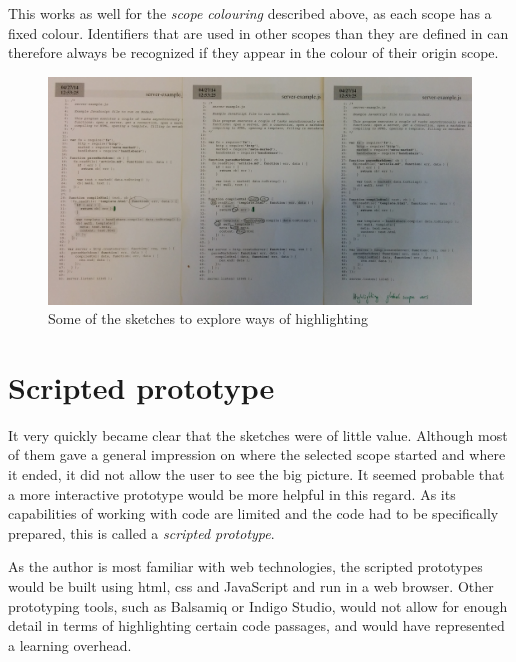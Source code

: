 This works as well for the \emph{scope colouring} described above, as
each scope has a fixed colour. Identifiers that are used in other scopes
than they are defined in can therefore always be recognized if they
appear in the colour of their origin scope.

\begin{figure}[htbp]
\centering
\includegraphics[keepaspectratio,width=\textwidth]{img/sketch_highlighting.jpeg}
\caption{Some of the sketches to explore ways of highlighting}
\label{fig:sketches2}
\end{figure}

\section{Scripted prototype}\label{scripted-prototype}

It very quickly became clear that the sketches were of little value.
Although most of them gave a general impression on where the selected
scope started and where it ended, it did not allow the user to see the
big picture. It seemed probable that a more interactive prototype would
be more helpful in this regard. As its capabilities of working with code
are limited and the code had to be specifically prepared, this is called
a \emph{scripted prototype}.

As the author is most familiar with web technologies, the scripted
prototypes would be built using \ac{html}, \ac{css} and JavaScript and
run in a web browser. Other prototyping tools, such as Balsamiq or
Indigo Studio, would not allow for enough detail in terms of
highlighting certain code passages, and would have represented a
learning overhead.

